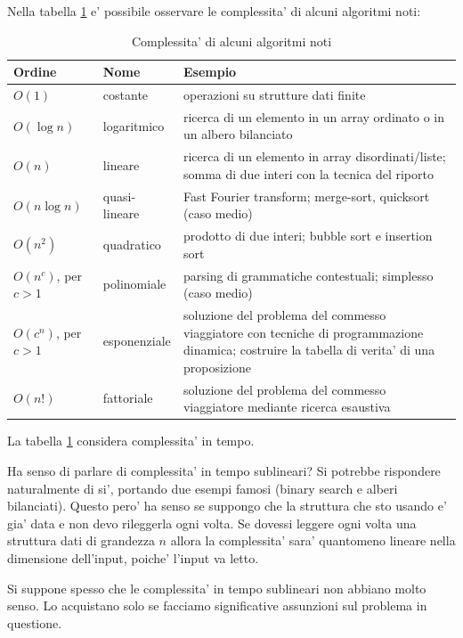 Nella tabella \ref{algocomp} e' possibile osservare le complessita' di alcuni algoritmi noti:
\begin{table}[h]
    \begin{tabular}{|l|l|p{7cm}|}
        \hline
        \textbf{Ordine} & \textbf{Nome} & \textbf{Esempio} \\
        \hline
        $O(1)$ & costante & operazioni su strutture dati finite \\
        \hline
        $O(\log n)$ & logaritmico & ricerca di un elemento in un array ordinato o in un albero
        bilanciato \\
        \hline
        $O(n)$ & lineare & ricerca di un elemento in array disordinati/liste; somma di due interi con la
        tecnica del riporto\\
        \hline
        $O(n\log n)$ & quasi-lineare & Fast Fourier transform; merge-sort, quicksort (caso medio)\\
        \hline
        $O(n^{2})$ & quadratico & prodotto di due interi; bubble sort e insertion sort \\
        \hline
        $O(n^{c})$, per $c > 1$ & polinomiale & parsing di grammatiche contestuali; simplesso (caso
        medio)\\
        \hline
        $O(c^{n})$, per $c > 1$ & esponenziale & soluzione del problema del commesso viaggiatore con
        tecniche di programmazione dinamica; costruire la tabella di verita' di una proposizione \\
        \hline
        $O(n!)$ & fattoriale & soluzione del problema del commesso viaggiatore mediante ricerca esaustiva \\
        \hline
    \end{tabular}
    \caption{Complessita' di alcuni algoritmi noti}
    \label{algocomp}
\end{table}

La tabella \ref{algocomp} considera complessita' in tempo.

Ha senso di parlare di complessita' in tempo sublineari? Si potrebbe rispondere naturalmente di si',
portando due esempi famosi (binary search e alberi bilanciati). Questo pero' ha senso se suppongo
che la struttura che sto usando e' gia' data e non devo rileggerla ogni volta. Se dovessi leggere
ogni volta una struttura dati di grandezza $n$ allora la complessita' sara' quantomeno lineare nella
dimensione dell'input, poiche' l'input va letto.

Si suppone spesso che le complessita' in tempo sublineari non abbiano molto senso. Lo acquistano
solo se facciamo significative assunzioni sul problema in questione.

